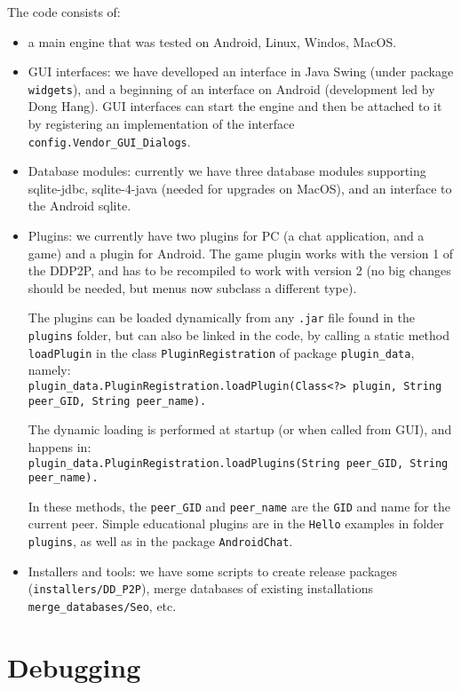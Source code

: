 \documentclass{book}
\begin{document}
The code consists of:
\begin{itemize}
\item a main engine that was tested on Android, Linux, Windos, MacOS.
\item GUI interfaces: we have develloped an interface in Java Swing (under package {\tt widgets}), and a beginning of an interface on Android (development led by Dong Hang). GUI interfaces can start the engine and then be attached to it by registering an implementation of the interface {\tt config.Vendor\_GUI\_Dialogs}.
\item Database modules: currently we have three database modules supporting sqlite-jdbc, sqlite-4-java (needed for upgrades on MacOS), and an interface to the Android sqlite.
\item Plugins: we currently have two plugins for PC (a chat application, and a game) and a plugin for Android. The game plugin works with the version 1 of the DDP2P, and has to be recompiled to work with version 2 (no big changes should be needed, but menus now subclass a different type).
 
The plugins can be loaded dynamically from any {\tt .jar} file found in the {\tt plugins} folder, but can also be linked in the code, by calling a static method {\tt loadPlugin} 
in the class {\tt PluginRegistration} of package {\tt plugin\_data}, namely:\\
 {\tt plugin\_data.PluginRegistration.loadPlugin(Class<?> plugin, String peer\_GID, String peer\_name).}

The dynamic loading is performed at startup (or when called from GUI), and happens in:\\
 {\tt plugin\_data.PluginRegistration.loadPlugins(String peer\_GID, String peer\_name).}

In these methods, the {\tt peer\_GID} and {\tt peer\_name} are the {\tt GID} and name for the current peer.
Simple educational plugins are in the {\tt Hello} examples in folder {\tt plugins}, as well as in the package {\tt AndroidChat}. 
\item Installers and tools: we have some scripts to create release packages ({\tt installers/DD\_P2P}), merge databases of existing installations {\tt merge\_databases/Seo}, etc.
\end{itemize}

\section{Debugging}
\end{document}
